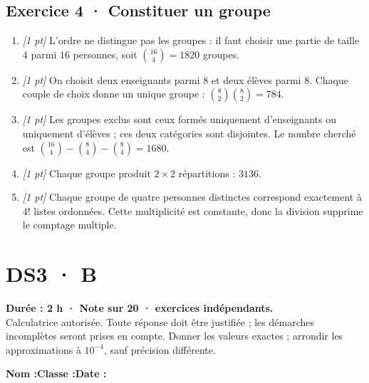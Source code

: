 \subsection*{Exercice 4 · Constituer un groupe}\begin{enumerate}

\item \textit{[1 pt]} L'ordre ne distingue pas les groupes : il faut choisir une partie de taille $4$ parmi $16$ personnes, soit $\binom{16}4=1820$ groupes.

\item \textit{[1 pt]} On choisit deux enseignants parmi $8$ et deux élèves parmi $8$. Chaque couple de choix donne un unique groupe : $\binom{8}2\binom{8}2=784$.

\item \textit{[1 pt]} Les groupes exclus sont ceux formés uniquement d'enseignants ou uniquement d'élèves ; ces deux catégories sont disjointes. Le nombre cherché est $\binom{16}4-\binom{8}4-\binom{8}4=1680$.

\item \textit{[1 pt]} Chaque groupe produit $2\times2$ répartitions : $3136$.

\item \textit{[1 pt]} Chaque groupe de quatre personnes distinctes correspond exactement à $4!$ listes ordonnées. Cette multiplicité est constante, donc la division supprime le comptage multiple.

\end{enumerate}

\fi

\fi

\ifmxteacher

\mxnewpage{}\label{sujet:4-4}

\section*{DS3 · B}


\textbf{Durée : 2 h · Note sur 20 ·  exercices indépendants.}\\Calculatrice autorisée. Toute réponse doit être justifiée ; les démarches incomplètes seront prises en compte. Donner les valeurs exactes ; arrondir les approximations à $10^{-4}$, sauf précision différente.

\smallskip\textbf{Nom :}\enspace\dotfill\quad\textbf{Classe :}\enspace\dotfill\quad\textbf{Date :}\enspace\dotfill

